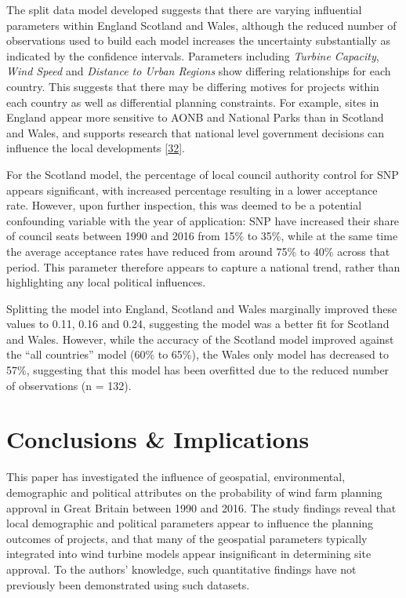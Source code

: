 \documentclass[a4paper,]{article}
\theoremstyle{definition}
\theoremstyle{definition}
\theoremstyle{definition}
\theoremstyle{remark}
\begin{document}
The split data model developed suggests that there are varying
influential parameters within England Scotland and Wales, although the
reduced number of observations used to build each model increases the
uncertainty substantially as indicated by the confidence intervals.
Parameters including \emph{Turbine Capacity}, \emph{Wind Speed} and
\emph{Distance to Urban Regions} show differing relationships for each
country. This suggests that there may be differing motives for projects
within each country as well as differential planning constraints. For
example, sites in England appear more sensitive to AONB and National
Parks than in Scotland and Wales, and supports research that national
level government decisions can influence the local developments
{[}\protect\hyperlink{ref-Langer2016}{32}{]}.

For the Scotland model, the percentage of local council authority
control for SNP appears significant, with increased percentage resulting
in a lower acceptance rate. However, upon further inspection, this was
deemed to be a potential confounding variable with the year of
application: SNP have increased their share of council seats between
1990 and 2016 from 15\% to 35\%, while at the same time the average
acceptance rates have reduced from around 75\% to 40\% across that
period. This parameter therefore appears to capture a national trend,
rather than highlighting any local political influences.

Splitting the model into England, Scotland and Wales marginally improved
these values to 0.11, 0.16 and 0.24, suggesting the model was a better
fit for Scotland and Wales. However, while the accuracy of the Scotland
model improved against the ``all countries'' model (60\% to 65\%), the
Wales only model has decreased to 57\%, suggesting that this model has
been overfitted due to the reduced number of observations (n = 132).

\section{Conclusions \& Implications}\label{conclusions-implications}

This paper has investigated the influence of geospatial, environmental,
demographic and political attributes on the probability of wind farm
planning approval in Great Britain between 1990 and 2016. The study
findings reveal that local demographic and political parameters appear
to influence the planning outcomes of projects, and that many of the
geospatial parameters typically integrated into wind turbine models
appear insignificant in determining site approval. To the authors'
knowledge, such quantitative findings have not previously been
demonstrated using such datasets.
\end{document}
